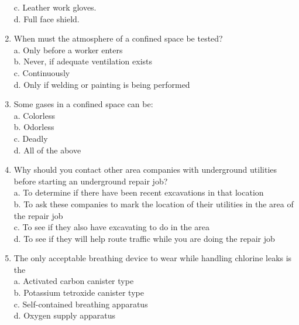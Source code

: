 \begin{enumerate}[1.]
c. Leather work gloves.\\
d. Full face shield.\\
\item When must the atmosphere of a confined space be tested?\\
a. Only before a worker enters\\
b. Never, if adequate ventilation exists\\
c. Continuously\\
d. Only if welding or painting is being performed\\
\item Some gases in a confined space can be:\\
a. Colorless\\
b. Odorless\\
c. Deadly\\
d. All of the above\\
\item Why should you contact other area companies with underground utilities before starting an underground repair job?\\
a. To determine if there have been recent excavations in that location\\
b. To ask these companies to mark the location of their utilities in the area of the repair job\\
c. To see if they also have excavating to do in the area\\
d. To see if they will help route traffic while you are doing the repair job\\
\item The only acceptable breathing device to wear while handling chlorine leaks is the\\
a. Activated carbon canister type\\
b. Potassium tetroxide canister type\\
c. Self-contained breathing apparatus\\
d. Oxygen supply apparatus\\

\end{enumerate}
